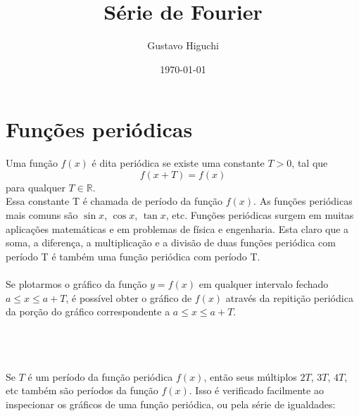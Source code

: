 \documentclass{article}
\title{Série de Fourier}
\author{Gustavo Higuchi}
\date{\today}
\begin{document}
\maketitle

\tableofcontents
\newpage


\section{Funções periódicas}
Uma função $f(x)$ é dita periódica se existe uma constante $T > 0$, tal que 
\begin{equation}
\label{prop1}
    f(x + T) = f(x)
\end{equation}
para qualquer $T \in \mathbb{R}$. \\
Essa constante T é chamada de período da função $f(x)$. As funções periódicas 
mais comuns são $\sin{x}$, $\cos{x}$, $\tan{x}$, etc. Funções periódicas surgem
em muitas aplicações matemáticas e em problemas de física e engenharia. Esta 
claro que a soma, a diferença, a multiplicação e a divisão de duas funções 
periódica com período T é também uma função periódica com período T.\\
\\
Se plotarmos o gráfico da função $y=f(x)$ em qualquer intervalo fechado 
\mbox{$a \leq x \leq a + T$}, é possível obter o gráfico de $f(x)$ através da 
repitição periódica da porção do gráfico correspondente a \mbox{$a \leq x \leq a + T$}.\\
\\
 \\
\\
Se $T$ é um período da função periódica $f(x)$, então seus múltiplos $2T$, $3T$, $4T$, etc 
também são períodos da função $f(x)$. Isso é verificado facilmente ao inspecionar 
os gráficos de uma função periódica, ou pela série de igualdades:
\end{document}
